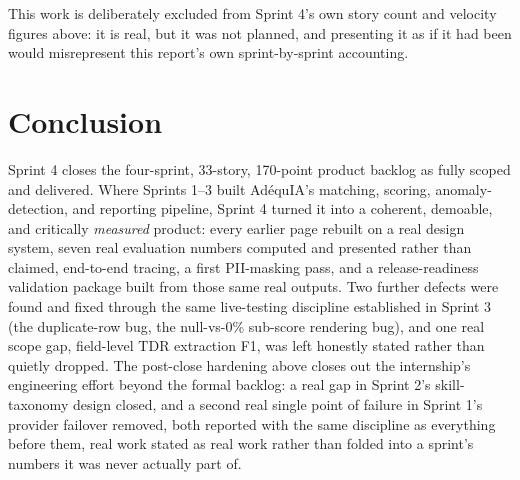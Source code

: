 This work is deliberately excluded from Sprint 4's own story count and
velocity figures above: it is real, but it was not planned, and
presenting it as if it had been would misrepresent this report's own
sprint-by-sprint accounting.

\section{Conclusion}

Sprint 4 closes the four-sprint, 33-story, 170-point product backlog as
fully scoped and delivered.
Where Sprints 1--3 built AdéquIA's matching, scoring, anomaly-detection,
and reporting pipeline, Sprint 4 turned it into a coherent, demoable, and
critically \emph{measured} product: every earlier page rebuilt on a
real design system, seven real evaluation numbers computed and presented
rather than claimed, end-to-end tracing, a first PII-masking pass, and
a release-readiness validation package built from those same real
outputs. Two further defects were found and fixed through the same
live-testing discipline established in Sprint 3 (the duplicate-row bug,
the null-vs-0\% sub-score rendering bug), and one real scope gap,
field-level TDR extraction F1, was left honestly stated rather than
quietly dropped. The post-close hardening above closes out the
internship's engineering effort beyond the formal backlog: a real gap in
Sprint 2's skill-taxonomy design closed, and a second real single point
of failure in Sprint 1's provider failover removed, both reported with
the same discipline as everything before them, real work stated as real
work rather than folded into a sprint's numbers it was never actually
part of.
